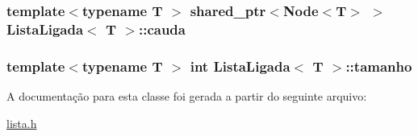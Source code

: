 \subsubsection[{\texorpdfstring{cauda}{cauda}}]{\setlength{\rightskip}{0pt plus 5cm}template$<$typename T $>$ shared\+\_\+ptr$<${\bf Node}$<$T$>$ $>$ {\bf Lista\+Ligada}$<$ T $>$\+::cauda\hspace{0.3cm}{\ttfamily [private]}}\hypertarget{classListaLigada_a7fbadfbdd19c26712c4f1045a7782804}{}\label{classListaLigada_a7fbadfbdd19c26712c4f1045a7782804}
\subsubsection[{\texorpdfstring{tamanho}{tamanho}}]{\setlength{\rightskip}{0pt plus 5cm}template$<$typename T $>$ int {\bf Lista\+Ligada}$<$ T $>$\+::tamanho\hspace{0.3cm}{\ttfamily [private]}}\hypertarget{classListaLigada_a7cb56d42e0603821e0b8f8645ec55ba0}{}\label{classListaLigada_a7cb56d42e0603821e0b8f8645ec55ba0}


A documentação para esta classe foi gerada a partir do seguinte arquivo\+:\begin{DoxyCompactItemize}
\item 
\hyperlink{lista_8h}{lista.\+h}\end{DoxyCompactItemize}
